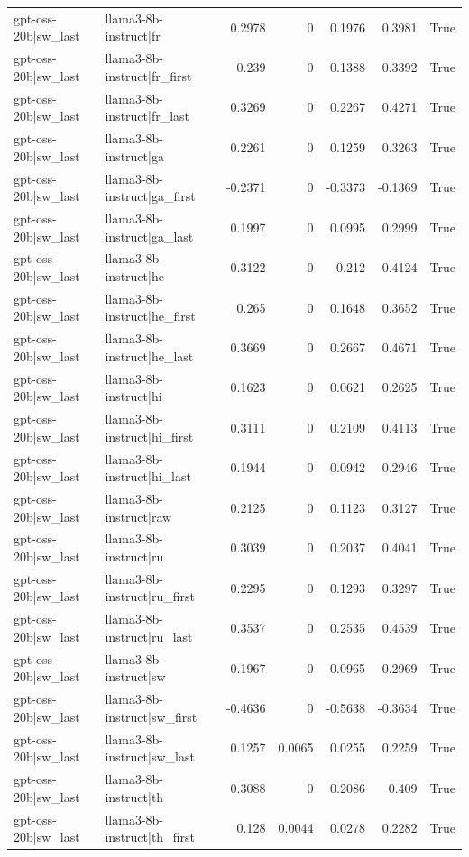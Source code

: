 \begin{table}
\begin{tabular}{l l r r r r l}
gpt-oss-20b|sw_last & llama3-8b-instruct|fr & 0.2978 & 0 & 0.1976 & 0.3981 & True \\
gpt-oss-20b|sw_last & llama3-8b-instruct|fr_first & 0.239 & 0 & 0.1388 & 0.3392 & True \\
gpt-oss-20b|sw_last & llama3-8b-instruct|fr_last & 0.3269 & 0 & 0.2267 & 0.4271 & True \\
gpt-oss-20b|sw_last & llama3-8b-instruct|ga & 0.2261 & 0 & 0.1259 & 0.3263 & True \\
gpt-oss-20b|sw_last & llama3-8b-instruct|ga_first & -0.2371 & 0 & -0.3373 & -0.1369 & True \\
gpt-oss-20b|sw_last & llama3-8b-instruct|ga_last & 0.1997 & 0 & 0.0995 & 0.2999 & True \\
gpt-oss-20b|sw_last & llama3-8b-instruct|he & 0.3122 & 0 & 0.212 & 0.4124 & True \\
gpt-oss-20b|sw_last & llama3-8b-instruct|he_first & 0.265 & 0 & 0.1648 & 0.3652 & True \\
gpt-oss-20b|sw_last & llama3-8b-instruct|he_last & 0.3669 & 0 & 0.2667 & 0.4671 & True \\
gpt-oss-20b|sw_last & llama3-8b-instruct|hi & 0.1623 & 0 & 0.0621 & 0.2625 & True \\
gpt-oss-20b|sw_last & llama3-8b-instruct|hi_first & 0.3111 & 0 & 0.2109 & 0.4113 & True \\
gpt-oss-20b|sw_last & llama3-8b-instruct|hi_last & 0.1944 & 0 & 0.0942 & 0.2946 & True \\
gpt-oss-20b|sw_last & llama3-8b-instruct|raw & 0.2125 & 0 & 0.1123 & 0.3127 & True \\
gpt-oss-20b|sw_last & llama3-8b-instruct|ru & 0.3039 & 0 & 0.2037 & 0.4041 & True \\
gpt-oss-20b|sw_last & llama3-8b-instruct|ru_first & 0.2295 & 0 & 0.1293 & 0.3297 & True \\
gpt-oss-20b|sw_last & llama3-8b-instruct|ru_last & 0.3537 & 0 & 0.2535 & 0.4539 & True \\
gpt-oss-20b|sw_last & llama3-8b-instruct|sw & 0.1967 & 0 & 0.0965 & 0.2969 & True \\
gpt-oss-20b|sw_last & llama3-8b-instruct|sw_first & -0.4636 & 0 & -0.5638 & -0.3634 & True \\
gpt-oss-20b|sw_last & llama3-8b-instruct|sw_last & 0.1257 & 0.0065 & 0.0255 & 0.2259 & True \\
gpt-oss-20b|sw_last & llama3-8b-instruct|th & 0.3088 & 0 & 0.2086 & 0.409 & True \\
gpt-oss-20b|sw_last & llama3-8b-instruct|th_first & 0.128 & 0.0044 & 0.0278 & 0.2282 & True \\

\end{tabular}
\end{table}

